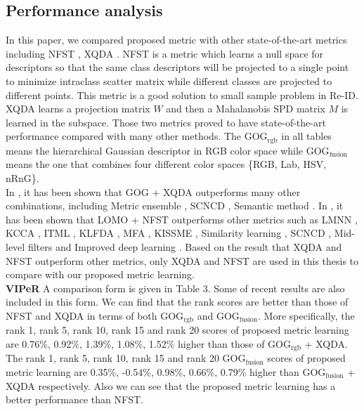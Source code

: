 \documentclass[10pt,twocolumn,letterpaper]{article}
\begin{document}
\subsection{Performance analysis}
In this paper, we compared proposed metric with other state-of-the-art metrics including NFST \cite{NFST}, XQDA \cite{LOMO}. NFST is a metric which learns a null space for descriptors so that the same class descriptors will be projected to a single point to minimize intraclass scatter matrix while different classes are projected to different points. This metric is a good solution to small sample problem in Re-ID. XQDA learns a projection matrix $W$ and then a Mahalanobis SPD matrix $M$ is learned in the subspace. Those two metrics proved to have state-of-the-art performance compared with many other methods. The GOG$_\text{rgb}$ in all tables means the hierarchical Gaussian descriptor in RGB color space while GOG$_\text{fusion}$ means the one that combines four different color spaces \{RGB, Lab, HSV, nRnG\}.\\
In \cite{GOG}, it has been shown that GOG + XQDA outperforms many other combinations, including Metric ensemble \cite{MetricEnsembles}, SCNCD \cite{SCNCD}, Semantic method \cite{SemanticMethod}. In \cite{ NFST}, it has been shown that LOMO + NFST outperforms other metrics such as LMNN \cite{LMNN}, KCCA \cite{KCCA}, ITML \cite{ITML}, KLFDA \cite{KLFDA}, MFA \cite{KernelVersionMetrics}, KISSME \cite{KISSME}, Similarity learning \cite{SimilarityLearning}, SCNCD \cite{SCNCD}, Mid-level filters \cite{MidlevelFilters} and Improved deep learning \cite{ImprovedCNN}. Based on the result that XQDA and NFST outperform other metrics, only XQDA and NFST are used in this thesis to compare with our proposed metric learning. \\
\textbf{VIPeR} A comparison form is given in Table 3. Some of recent results are also included in this form. We can find that the rank scores are better than those of NFST and XQDA in terms of both GOG$_\text{rgb}$ and GOG$_\text{fusion}$. More specifically, the rank 1, rank 5, rank 10, rank 15 and rank 20 scores of proposed metric learning are 0.76\%, 0.92\%, 1.39\%, 1.08\%, 1.52\% higher than those of GOG$_\text{rgb}$ + XQDA. The rank 1, rank 5, rank 10, rank 15 and rank 20 GOG$_\text{fusion}$ scores of proposed metric learning are 0.35\%, -0.54\%, 0.98\%, 0.66\%, 0.79\% higher than GOG$_\text{fusion}$ + XQDA respectively. Also we can see that the proposed metric learning has a better performance than NFST. 
\end{document}
